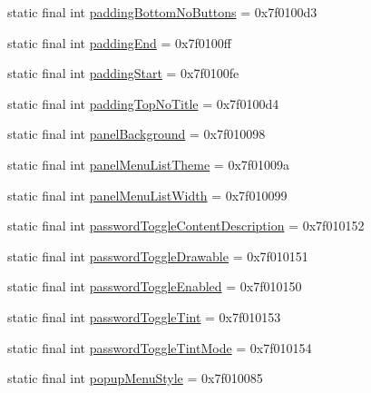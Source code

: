 \begin{CompactItemize}
\item 
static final int \hyperlink{classandroid_1_1support_1_1v7_1_1cardview_1_1_r_1_1attr_448e41b242eb37c2a11ed6d198179440}{paddingBottomNoButtons} = 0x7f0100d3
\item 
static final int \hyperlink{classandroid_1_1support_1_1v7_1_1cardview_1_1_r_1_1attr_74874c3595db3e88b1ab94f9a50b3f54}{paddingEnd} = 0x7f0100ff
\item 
static final int \hyperlink{classandroid_1_1support_1_1v7_1_1cardview_1_1_r_1_1attr_7b42a5f2187b5e70cf49f7aa87d465a1}{paddingStart} = 0x7f0100fe
\item 
static final int \hyperlink{classandroid_1_1support_1_1v7_1_1cardview_1_1_r_1_1attr_9cdeb54ffc1091cf2e91b8d47ffc9134}{paddingTopNoTitle} = 0x7f0100d4
\item 
static final int \hyperlink{classandroid_1_1support_1_1v7_1_1cardview_1_1_r_1_1attr_201d459ba31744c12b8adec19a551f8f}{panelBackground} = 0x7f010098
\item 
static final int \hyperlink{classandroid_1_1support_1_1v7_1_1cardview_1_1_r_1_1attr_5fc9232b4ec9eaa4a1c94a413e18e941}{panelMenuListTheme} = 0x7f01009a
\item 
static final int \hyperlink{classandroid_1_1support_1_1v7_1_1cardview_1_1_r_1_1attr_df0f92ce375669ad9cacc29288b8d980}{panelMenuListWidth} = 0x7f010099
\item 
static final int \hyperlink{classandroid_1_1support_1_1v7_1_1cardview_1_1_r_1_1attr_f62fd69dd794e5e7c7d8119057d8a546}{passwordToggleContentDescription} = 0x7f010152
\item 
static final int \hyperlink{classandroid_1_1support_1_1v7_1_1cardview_1_1_r_1_1attr_25149de4924974167b8dc2bb764900bc}{passwordToggleDrawable} = 0x7f010151
\item 
static final int \hyperlink{classandroid_1_1support_1_1v7_1_1cardview_1_1_r_1_1attr_3621bc59ef043c467d8154464f1582dd}{passwordToggleEnabled} = 0x7f010150
\item 
static final int \hyperlink{classandroid_1_1support_1_1v7_1_1cardview_1_1_r_1_1attr_9f4c38942c26755f95f56dfc86904d65}{passwordToggleTint} = 0x7f010153
\item 
static final int \hyperlink{classandroid_1_1support_1_1v7_1_1cardview_1_1_r_1_1attr_ae056f77b4877e47736203c6e8a2b9fb}{passwordToggleTintMode} = 0x7f010154
\item 
static final int \hyperlink{classandroid_1_1support_1_1v7_1_1cardview_1_1_r_1_1attr_c200e583007fb750c0d3028dfb4f3080}{popupMenuStyle} = 0x7f010085
\item 

\end{CompactItemize}
